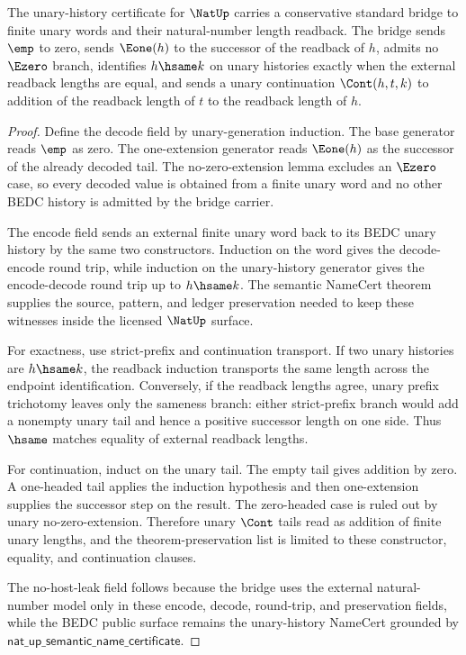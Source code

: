 \begin{theorem}
\label{thm:natup-unary-standard-bridge}
The unary-history certificate for $\NatUp$ carries a conservative standard
bridge to finite unary words and their natural-number length readback. The
bridge sends $\emp$ to zero, sends $\Eone(h)$ to the successor of the readback
of $h$, admits no $\Ezero$ branch, identifies $h\hsame k$ on unary histories
exactly when the external readback lengths are equal, and sends a unary
continuation $\Cont(h,t,k)$ to addition of the readback length of $t$ to the
readback length of $h$.
\end{theorem}
\begin{proof}
Define the decode field by unary-generation induction. The base generator reads
$\emp$ as zero. The one-extension generator reads $\Eone(h)$ as the successor
of the already decoded tail. The no-zero-extension lemma excludes an $\Ezero$
case, so every decoded value is obtained from a finite unary word and no other
BEDC history is admitted by the bridge carrier.

The encode field sends an external finite unary word back to its BEDC unary
history by the same two constructors. Induction on the word gives the
decode-encode round trip, while induction on the unary-history generator gives
the encode-decode round trip up to $h\hsame k$. The semantic NameCert theorem
supplies the source, pattern, and ledger preservation needed to keep these
witnesses inside the licensed $\NatUp$ surface.

For exactness, use strict-prefix and continuation transport. If two unary
histories are $h\hsame k$, the readback induction transports the same length
across the endpoint identification. Conversely, if the readback lengths agree,
unary prefix trichotomy leaves only the sameness branch: either strict-prefix
branch would add a nonempty unary tail and hence a positive successor length on
one side. Thus $\hsame$ matches equality of external readback lengths.

For continuation, induct on the unary tail. The empty tail gives addition by
zero. A one-headed tail applies the induction hypothesis and then one-extension
supplies the successor step on the result. The zero-headed case is ruled out by
unary no-zero-extension. Therefore unary $\Cont$ tails read as addition of
finite unary lengths, and the theorem-preservation list is limited to these
constructor, equality, and continuation clauses.

The no-host-leak field follows because the bridge uses the external
natural-number model only in these encode, decode, round-trip, and preservation
fields, while the BEDC public surface remains the unary-history NameCert
grounded by $\mathsf{nat\_up\_semantic\_name\_certificate}$.
\end{proof}

